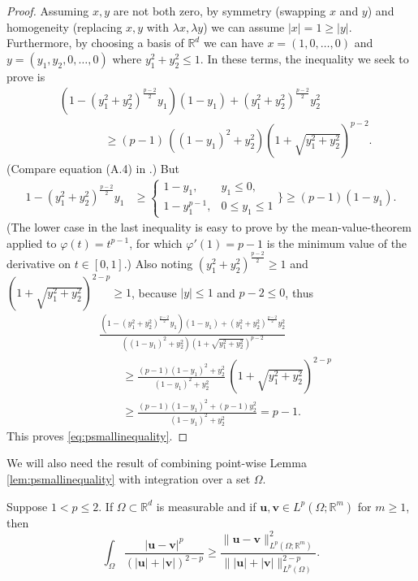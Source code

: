 \documentclass[final,onefignum]{siamart190516}
\newcommand\bu{\mathbf{u}}
\newcommand\bv{\mathbf{v}}
\newcommand\RR{\mathbb{R}}
\begin{document}
\begin{proof}  Assuming $x,y$ are not both zero, by symmetry (swapping $x$ and $y$) and homogeneity (replacing $x,y$ with $\lambda x,\lambda y$) we can assume $|x| = 1 \ge |y|$.  Furthermore, by choosing a basis of $\RR^d$ we can have $x=(1,0,\dots,0)$ and $y=(y_1,y_2,0,\dots,0)$ where $y_1^2+y_2^2 \le 1$.  In these terms, the inequality we seek to prove is
\begin{align*}
&\left(1 - (y_1^2+y_2^2)^{\frac{p-2}{2}} y_1\right) (1-y_1) + (y_1^2+y_2^2)^{\frac{p-2}{2}} y_2^2 \\
&\qquad\qquad \ge (p-1)\, \left((1-y_1)^2+y_2^2\right) \left(1 + \sqrt{y_1^2+y_2^2} \right)^{p-2}.
\end{align*}
(Compare equation (A.4) in \cite{Peral1997}.)  But
\begin{align*}
1 - (y_1^2+y_2^2)^{\frac{p-2}{2}} y_1
      &\ge \begin{cases} 1-y_1, & y_1 \le 0, \\
                        1-y_1^{p-1}, & 0 \le y_1 \le 1 \end{cases}\Bigg\}
      \ge (p-1) (1-y_1).
\end{align*}
(The lower case in the last inequality is easy to prove by the mean-value-theorem applied to $\varphi(t)=t^{p-1}$, for which $\varphi'(1)=p-1$ is the minimum value of the derivative on $t\in[0,1]$.)  Also noting $(y_1^2+y_2^2)^{\frac{p-2}{2}} \ge 1$ and $\left(1 + \sqrt{y_1^2+y_2^2} \right)^{2-p} \ge 1$, because $|y|\le 1$ and $p-2\le 0$, thus
\begin{align*}
&\frac{\left(1 - (y_1^2+y_2^2)^{\frac{p-2}{2}} y_1\right) (1-y_1) + (y_1^2+y_2^2)^{\frac{p-2}{2}} y_2^2}
      {\left((1-y_1)^2+y_2^2\right) \left(1 + \sqrt{y_1^2+y_2^2} \right)^{p-2}} \\
&\qquad \ge \frac{(p-1) (1-y_1)^2 + y_2^2}
      {(1-y_1)^2+y_2^2} \,  \left(1 + \sqrt{y_1^2+y_2^2} \right)^{2-p} \\
&\qquad \ge \frac{(p-1) (1-y_1)^2 + (p-1) y_2^2}{(1-y_1)^2+y_2^2} = p-1.
\end{align*}
This proves \eqref{eq:psmallinequality}. \end{proof}

We will also need the result of combining point-wise Lemma \ref{lem:psmallinequality} with integration over a set $\Omega$.

\begin{lemma} \label{lem:smallpbound}  Suppose $1<p\le 2$.  If $\Omega \subset \RR^d$ is measurable and if $\bu,\bv\in L^p(\Omega; \RR^m)$ for $m\ge 1$, then
\begin{equation}
    \int_\Omega \frac{|\bu-\bv|^p}{\left(|\bu|+|\bv|\right)^{2-p}} \ge \frac{\|\bu-\bv\|_{L^p(\Omega; \RR^m)}^2}{\big\||\bu|+|\bv|\big\|_{L^p(\Omega)}^{2-p}}. \label{eq:smallpbound}
\end{equation}
\end{lemma}
\end{document}
